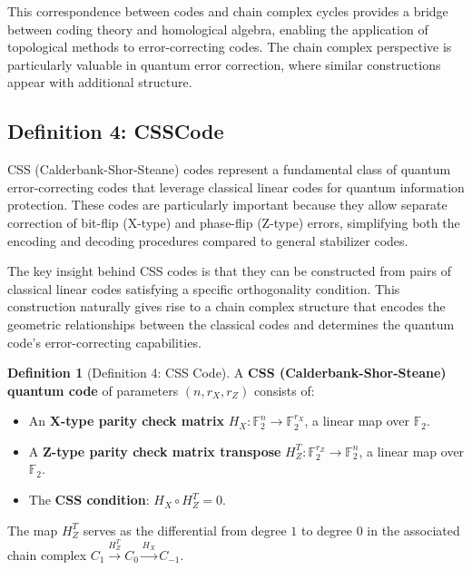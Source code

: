 \documentclass[11pt]{article}
\theoremstyle{plain}
\theoremstyle{definition}
\newtheorem*{definition}{Definition}
\theoremstyle{remark}
\begin{document}
This correspondence between codes and chain complex cycles provides a bridge between coding theory and homological algebra, enabling the application of topological methods to error-correcting codes. The chain complex perspective is particularly valuable in quantum error correction, where similar constructions appear with additional structure.

\vspace{1em}

\subsection{Definition 4: CSSCode}

CSS (Calderbank-Shor-Steane) codes represent a fundamental class of quantum error-correcting codes that leverage classical linear codes for quantum information protection. These codes are particularly important because they allow separate correction of bit-flip (X-type) and phase-flip (Z-type) errors, simplifying both the encoding and decoding procedures compared to general stabilizer codes.

The key insight behind CSS codes is that they can be constructed from pairs of classical linear codes satisfying a specific orthogonality condition. This construction naturally gives rise to a chain complex structure that encodes the geometric relationships between the classical codes and determines the quantum code's error-correcting capabilities.

\begin{definition}[Definition 4: CSS Code]
A \textbf{CSS (Calderbank-Shor-Steane) quantum code} of parameters $(n, r_X, r_Z)$ consists of:
\begin{itemize}
  \item An \textbf{X-type parity check matrix} $H_X : \mathbb{F}_2^n \to \mathbb{F}_2^{r_X}$, a linear map over $\mathbb{F}_2$.
  \item A \textbf{Z-type parity check matrix transpose} $H_Z^T : \mathbb{F}_2^{r_Z} \to \mathbb{F}_2^n$, a linear map over $\mathbb{F}_2$.
  \item The \textbf{CSS condition}: $H_X \circ H_Z^T = 0$.
\end{itemize}
The map $H_Z^T$ serves as the differential from degree $1$ to degree $0$ in the associated chain complex $C_1 \xrightarrow{H_Z^T} C_0 \xrightarrow{H_X} C_{-1}$.
\end{definition}
\end{document}
